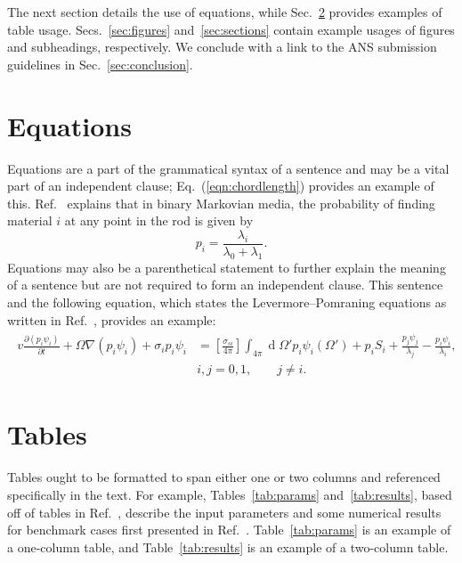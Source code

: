 \documentclass{article}                                                                           %
\DeclareMathOperator{\diff}{d}                                                                %
\begin{document}
The next section details the use of equations, while Sec.~\ref{sec:tables} provides examples of table usage.
Secs.~\ref{sec:figures} and~\ref{sec:sections} contain example usages of figures and subheadings, respectively.
We conclude with a link to the ANS submission guidelines in Sec.~\ref{sec:conclusion}.




\section{Equations}
\label{sec:equations}

Equations are a part of the grammatical syntax of a sentence and may be a vital part of an independent clause; Eq.~(\ref{eqn:chordlength}) provides an example of this.
Ref.~\cite{AdamsJQSRT1989} explains that in binary Markovian media, the probability of finding material \(i\) at any point in the rod is given by
\begin{equation}
  p_i = \frac{\lambda_i}{\lambda_0 + \lambda_1}.
  \label{eqn:chordlength}
\end{equation}
Equations may also be a parenthetical statement to further explain the meaning of a sentence but are not required to form an independent clause.
This sentence and the following equation, which states the Levermore--Pomraning equations as written in Ref.~\cite{AdamsJQSRT1989}, provides an example:
\begin{align}
\begin{split}
  v \frac{\partial(p_i \psi_i)}{\partial t} + \Omega \nabla(p_i \psi_i) + \sigma_i p_i \psi_i &= \left[ \frac{\sigma_{si}}{4\pi} \right] \int_{4\pi} \diff \Omega' p_i \psi_i(\Omega') + p_i S_i + \frac{p_j \psi_j}{\lambda_j} - \frac{p_i \psi_i}{\lambda_i}, \\
  & i, j = 0,1, \qquad j \neq i.
\end{split}
  \label{eqn:LPequations}
\end{align}




\section{Tables}
\label{sec:tables}

Tables ought to be formatted to span either one or two columns and referenced
specifically in the text.
For example, Tables~\ref{tab:params} and~\ref{tab:results}, based off of
tables in Ref.~\cite{BrantleyMC2009Incident}, describe the input parameters and some numerical
results for benchmark cases first presented in Ref.~\cite{AdamsJQSRT1989}.
Table~\ref{tab:params} is an example of a one-column table, and Table~\ref{tab:results}
is an example of a two-column table.
\end{document}
